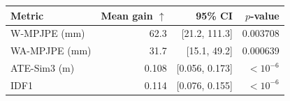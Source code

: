 \begin{tabular}{lrrr}
\toprule
Metric & Mean gain $\uparrow$ & 95\% CI & $p$-value \\
\midrule
W-MPJPE (mm) & 62.3 & [21.2, 111.3] & 0.003708 \\
WA-MPJPE (mm) & 31.7 & [15.1, 49.2] & 0.000639 \\
ATE-Sim3 (m) & 0.108 & [0.056, 0.173] & $<10^{-6}$ \\
IDF1 & 0.114 & [0.076, 0.155] & $<10^{-6}$ \\
\bottomrule
\end{tabular}
